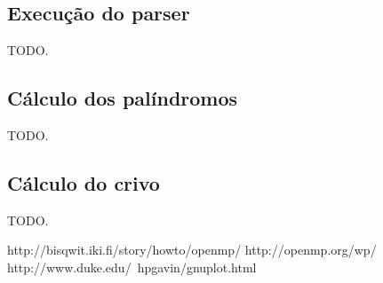 \documentclass[a4paper]{article}
\begin{document}
\subsection{Execução do parser}
\indent \indent TODO.

\subsection{Cálculo dos palíndromos}
\indent \indent TODO.

\subsection{Cálculo do crivo}
\indent \indent TODO.

\newpage
\begin{thebibliography}{99}
	http://bisqwit.iki.fi/story/howto/openmp/
	http://openmp.org/wp/
	http://www.duke.edu/~hpgavin/gnuplot.html
\end{thebibliography}
\end{document}
